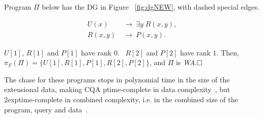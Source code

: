 \documentclass[format=acmsmall, review=false, screen=true]{acmart}
\newcommand{\boxtheorem}{\ensuremath{\hfill \Box}}
\newcommand{\prg}{\Pi}
\newcommand{\rank}{\pi}
\newcommand{\finiteRank}{\rank_F}
\newcommand{\m}{\;\!\!}
\newcommand{\WA}{{\em W\m{}A}}
\newcommand{\exptime}{{\sc exptime}}
\newcommand{\ptime}{{\sc ptime}}
\newcommand{\blue}[1]{{#1}}
\newcommand{\comlb}[1]{{\vspace{2mm}\noindent \bf \blue{COMM(LEO):}}~ #1 \hfill {\bf
    END.}\\}
\newcommand{\commos}[1]{{\vspace{2mm}\noindent \bf \blue{COMM(MOSTAFA):}}~ #1 \hfill {\bf
    END.}\\}
\begin{document}
\begin{example} \label{ex:dgNEW} Program $\Pi$ below has the DG in Figure ~\ref{fig:dgNEW}, with dashed special edges.

\vspace{2mm}
\begin{minipage}[t]{0.45\textwidth}
\resizebox{!}{2.0cm}{}
\label{fig:dgNEW}
\vspace{3mm}
\end{minipage}\hfill
\begin{minipage}[t]{0.5\textwidth}
{\centering
\vspace{-2.3cm}
\begin{align*}
  U(x) &~\rightarrow~ \exists y\;R(x,y),\\
  R(x,y) &~\rightarrow~ P(x,y).%
\end{align*}
}

\vspace{-6mm}\phantom{oo}

\noindent $U[1]$, $R[1]$ and $P[1]$ have rank $0$. \ $R[2]$ and $P[2]$ have rank  $1$. Then, $\finiteRank(\prg) = \{U[1], R[1], P[1], R[2], P[2]\}$, and   $\Pi$  is \WA.\boxtheorem
\end{minipage}
\end{example}

\vspace{-3mm}The chase for these programs stops in polynomial time in the size of the extensional data, making  CQA  \ptime-complete in data complexity~\cite{fagin}, but  2\exptime-complete in combined complexity, i.e. in the combined size of the program, query  and data~\cite{kolaitis}.



\end{document}
